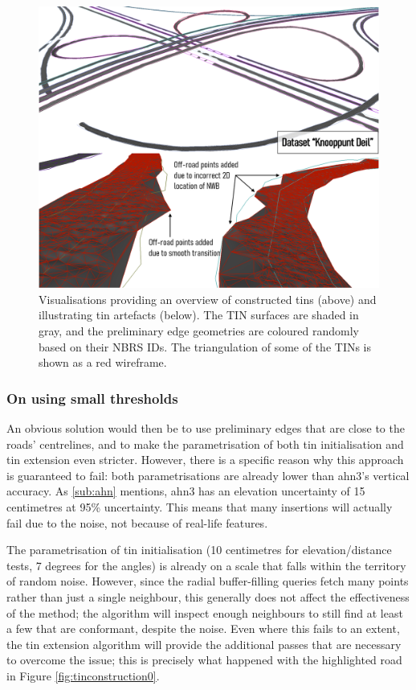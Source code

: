 \begin{figure}[h]
    \centering
    \includegraphics[width=0.9\linewidth]{final_report/figs/tinconstruction1.png}
    \caption[Overview render of constructed TINs and renders of TIN artefacts]{Visualisations providing an overview of constructed \ac{tin}s (above) and illustrating \ac{tin} artefacts (below). The TIN surfaces are shaded in gray, and the preliminary edge geometries are coloured randomly based on their NBRS IDs. The triangulation of some of the TINs is shown as a red wireframe.}
    \label{fig:tinconstruction1}
\end{figure}

\subsubsection{On using small thresholds}

An obvious solution would then be to use preliminary edges that are close to the roads' centrelines, and to make the parametrisation of both \ac{tin} initialisation and \ac{tin} extension even stricter. However, there is a specific reason why this approach is guaranteed to fail: both parametrisations are already lower than \ac{ahn3}'s vertical accuracy. As \ref{sub:ahn} mentions, \ac{ahn3} has an elevation uncertainty of 15 centimetres at 95\% uncertainty. This means that many insertions will actually fail due to the noise, not because of real-life features.

The parametrisation of \ac{tin} initialisation (10 centimetres for elevation/distance tests, 7 degrees for the angles) is already on a scale that falls within the territory of random noise. However, since the radial buffer-filling queries fetch many points rather than just a single neighbour, this generally does not affect the effectiveness of the method; the algorithm will inspect enough neighbours to still find at least a few that are conformant, despite the noise. Even where this fails to an extent, the \ac{tin} extension algorithm will provide the additional passes that are necessary to overcome the issue; this is precisely what happened with the highlighted road in Figure \ref{fig:tinconstruction0}.

